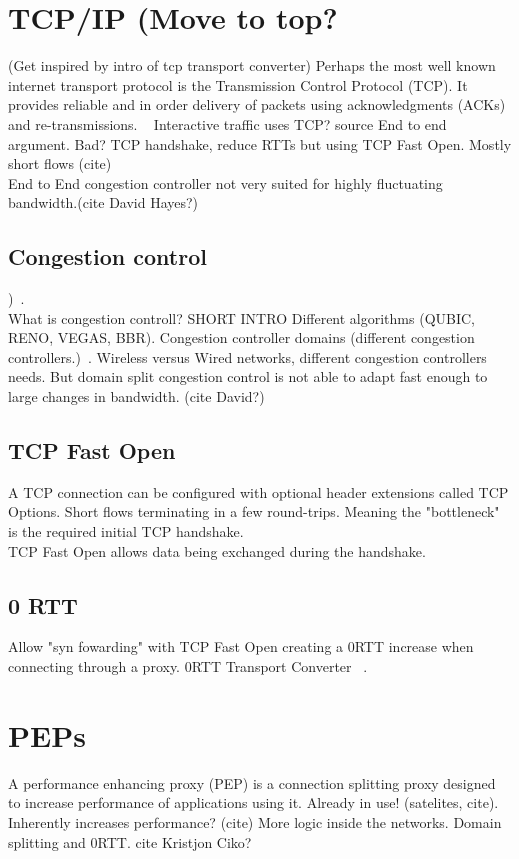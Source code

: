 \documentclass[a4paper,english, 11pt]{report}
\begin{document}
\section{TCP/IP (Move to top?}
(Get inspired by intro of tcp transport converter)
Perhaps the most well known internet transport protocol is the Transmission Control Protocol (TCP). It provides reliable and in order delivery of packets using acknowledgments (ACKs) and re-transmissions. ~\cite{Eddy_2022}
Interactive traffic uses TCP? {source}
End to end argument. Bad?
TCP handshake, reduce RTTs but using TCP Fast Open. Mostly short flows (cite)
\\
End to End congestion controller not very suited for highly fluctuating bandwidth.(cite David Hayes?)

\subsection{Congestion control}
)~\cite{welzl_congestion}.\\
What is congestion controll? SHORT INTRO
Different algorithms (QUBIC, RENO, VEGAS, BBR).
Congestion controller domains (different congestion controllers.)~\cite{rfc5783}.
Wireless versus Wired networks, different congestion controllers needs.
But domain split congestion control is not able to adapt fast enough to large changes in bandwidth. (cite David?)

\subsection{TCP Fast Open}
A TCP connection can be configured with optional header extensions called TCP Options. 
Short flows terminating in a few round-trips. Meaning the "bottleneck" is the required initial TCP handshake.\\
TCP Fast Open allows data being exchanged during the handshake. 

\subsection{0 RTT}
Allow "syn fowarding" with TCP Fast Open creating a 0RTT increase when connecting through a proxy.
0RTT Transport Converter ~\cite{rfc8803}.


\section{PEPs}
A performance enhancing proxy (PEP) is a connection splitting proxy designed to increase performance of applications using it. Already in use! (satelites, cite). Inherently increases performance? (cite)
More logic inside the networks. Domain splitting and 0RTT. {cite Kristjon Ciko?}
\end{document}
